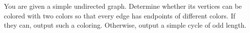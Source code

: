 You are given a simple undirected graph. Determine whether its vertices can be colored with two colors so that every edge has endpoints of different colors. If they can, output such a coloring. Otherwise, output a simple cycle of odd length.
